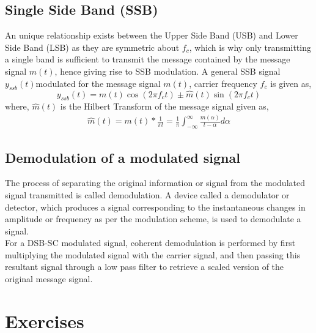 \documentclass{lab_sheet}
\begin{document}
\subsection{Single Side Band (SSB)}
An unique relationship exists between the Upper Side Band (USB) and Lower Side Band (LSB) as they are symmetric about $f_c$, which is why only transmitting a single band is sufficient to transmit the message contained by the message signal $m(t)$, hence giving rise to SSB modulation. A general SSB signal $y_{ssb}(t)$modulated for the message signal $m(t)$, carrier frequency $f_c$ is given as,
\begin{equation}
    y_{ssb}(t)=m(t)\cos(2\pi f_ct)\pm \hat m(t)\sin(2\pi f_ct)
\end{equation}
where, $\hat m(t)$ is the Hilbert Transform of the message signal given as,
\begin{equation*}
    \begin{aligned}
        \hat m(t)=m(t)*\frac{1}{\pi t}=\frac{1}{\pi}\int_{-\infty}^{\infty}\frac{m(\alpha)}{t-\alpha}d\alpha
    \end{aligned}
\end{equation*}
\subsection{Demodulation of a modulated signal}
The process of separating the original information or signal from the modulated signal transmitted is called demodulation. A device called a demodulator or detector, which produces a signal corresponding to the instantaneous changes in amplitude or frequency as per the modulation scheme, is used to demodulate a signal.\\
For a DSB-SC modulated signal, coherent demodulation is performed by first multiplying the modulated signal with the carrier signal, and then passing this resultant signal through a low pass filter to retrieve a scaled version of the original message signal.
\pagebreak
\section{Exercises}
\end{document}
